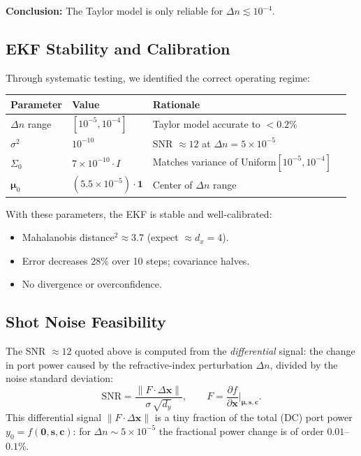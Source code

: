 \documentclass[11pt,a4paper]{article}
\begin{document}
\textbf{Conclusion:} The Taylor model is only reliable for $\Delta n \lesssim 10^{-4}$.

\subsection{EKF Stability and Calibration}

Through systematic testing, we identified the correct operating regime:

\begin{center}
\begin{tabular}{@{}llll@{}}
\toprule
Parameter & Value & Rationale \\
\midrule
$\Delta n$ range & $[10^{-5}, 10^{-4}]$ & Taylor model accurate to $<0.2\%$ \\
$\sigma^2$ & $10^{-10}$ & SNR $\approx 12$ at $\Delta n = 5 \times 10^{-5}$ \\
$\Sigma_0$ & $7 \times 10^{-10} \cdot I$ & Matches variance of Uniform$[10^{-5}, 10^{-4}]$ \\
$\bm{\mu}_0$ & $(5.5 \times 10^{-5}) \cdot \bm{1}$ & Center of $\Delta n$ range \\
\bottomrule
\end{tabular}
\end{center}

With these parameters, the EKF is stable and well-calibrated:
\begin{itemize}[nosep]
  \item Mahalanobis distance$^2 \approx 3.7$ (expect $\approx d_x = 4$).
  \item Error decreases 28\% over 10 steps; covariance halves.
  \item No divergence or overconfidence.
\end{itemize}

\subsection{Shot Noise Feasibility}

The SNR $\approx 12$ quoted above is computed from the \emph{differential} signal: the change in port power caused by the refractive-index perturbation $\Delta n$, divided by the noise standard deviation:
\[
  \text{SNR} = \frac{\|F \cdot \Delta\bm{x}\|}{\sigma\,\sqrt{d_y}},
  \qquad F = \frac{\partial f}{\partial \bm{x}}\bigg|_{\bm{\mu},\bm{s},\bm{c}}.
\]
This differential signal $\|F \cdot \Delta\bm{x}\|$ is a tiny fraction of the total (DC) port power $y_0 = f(\bm{0}, \bm{s}, \bm{c})$: for $\Delta n \sim 5 \times 10^{-5}$ the fractional power change is of order $0.01$--$0.1\%$.
\end{document}
